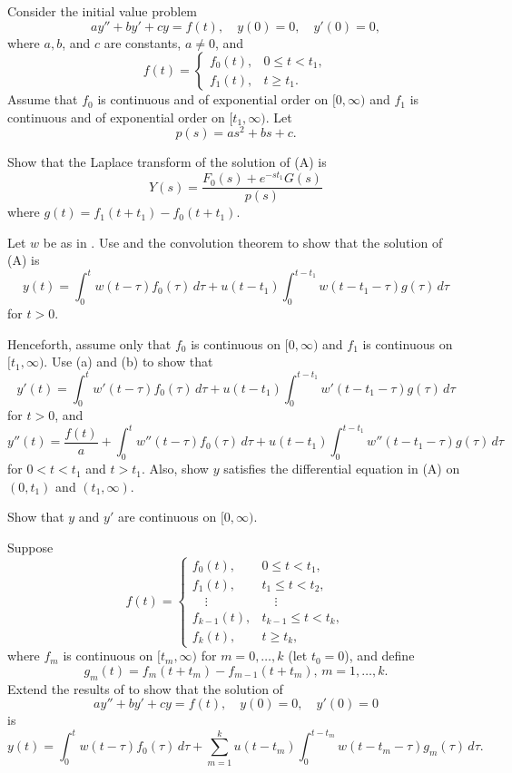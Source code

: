 \begin{exerciselist}
\item\label{exer:8.6.12}Consider the initial value problem
\[
ay''+by'+cy=f(t),\quad y(0)=0,\quad y'(0)=0,
\tag{A}
\]
where $a,b$, and $c$ are constants, $a\ne0$, and
\[
f(t)=\begin{cases}
f_0(t),&0\le t<t_1,\\
f_1(t),&t\ge t_1.
\end{cases}
\]
Assume that $f_0$ is continuous and of exponential order on $[0,\infty)$
and $f_1$ is continuous and of exponential order on $[t_1,\infty)$.
Let
\[
p(s)=as^2+bs+c.
\]
\begin{alist}
\item %
Show that the Laplace transform of the solution of  (A)
is
\[
Y(s)=\frac{F_0(s)+e^{-st_1}G(s)}{p(s)}
\]
where  $g(t)=f_1(t+t_1)-f_0(t+t_1)$.
\item %
Let $w$ be as in .
Use  and the convolution theorem
to show that the solution of  (A) is
\[
y(t)=\int_0^t
w(t-\tau)f_0(\tau)\,d\tau+u(t-t_1)\int_0^{t-t_1}
w(t-t_1-\tau)g(\tau)\,d\tau
\]
for $t>0$.
\item %
Henceforth,  assume only that $f_0$ is continuous on $[0,\infty)$ and $f_1$
 is continuous on $[t_1,\infty)$.
 Use   (a) and (b) to show that
\[
y'(t)=\int_0^t
w'(t-\tau)f_0(\tau)\,d\tau+u(t-t_1)\int_0^{t-t_1}
w'(t-t_1-\tau)g(\tau)\,d\tau
\]
for $t>0$, and
\[
y''(t)=\frac{f(t)}{a}+\int_0^t
w''(t-\tau)f_0(\tau)\,d\tau+u(t-t_1)\int_0^{t-t_1}
w''(t-t_1-\tau)g(\tau)\,d\tau
\]
for $0<t<t_1$ and $t>t_1$. Also, show
 $y$ satisfies the differential equation in
(A) on$(0,t_1)$ and $(t_1,\infty)$.
\item %
Show that $y$ and $y'$ are continuous on $[0,\infty)$.
\end{alist}

\item\label{exer:8.6.13}Suppose
\[
f(t)=\begin{cases}
 f_0(t),&0\le t < t_1,\\
 f_1(t),&t_1\le t < t_2,\\
\quad\vdots&\quad\vdots\\
f_{k-1}(t),&t_{k-1}\le t < t_k,\\[5pt]
 f_k(t),&t\ge t_k,
\end{cases}
\]
where  $f_m$ is continuous on $[t_m,\infty)$ for $m=0,\dots,k$
(let $t_0=0$),  and define
\[
g_m(t)=f_m(t+t_m)-f_{m-1}(t+t_m) ,\, m=1,\dots,k.
\]
Extend the results of  to show that
the solution of
\[
ay''+by'+cy=f(t),\quad y(0)=0,\quad y'(0)=0
\]
is
\[
y(t)=\int_0^t w(t-\tau)f_0(\tau)\,d\tau+\sum_{m=1}^ku(t-t_m)
\int_0^{t-t_m}w(t-t_m-\tau)g_m(\tau)\,d\tau.
\]


\end{exerciselist}
